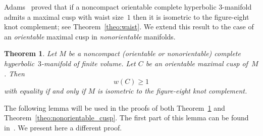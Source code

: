 \documentclass[11pt,reqno]{amsart}
\newtheorem{theorem}{Theorem}[section]
\newtheorem{proposition}[theorem]{Proposition}
\theoremstyle{definition}
\numberwithin{equation}{section}
\numberwithin{equation}{section}
\begin{document}
Adams~\cite{adams_waist} proved that if a noncompact orientable complete hyperbolic $3$-manifold admits a maximal cusp with waist size~$1$ then it is isometric to the figure-eight knot complement; see Theorem~\ref{theo:waist}.
We extend this result to the case of an \emph{orientable} maximal cusp in \emph{nonorientable} manifolds.


\begin{theorem} \label{theo:adams_nonorientable}
Let $M$ be a noncompact (orientable or nonorientable) complete hyperbolic~$3$-manifold of finite volume.
Let $C$ be an orientable maximal cusp of~$M$.
Then 
\[
w(C) \geq 1
\]
with equality if and only if $M$ is isometric to the figure-eight knot complement.
\end{theorem}


%




The following lemma will be used in the proofs of both Theorem~\ref{theo:adams_nonorientable} and Theorem~\ref{theo:nonorientable_cusp}.
The first part of this lemma can be found in~\cite[Lemma~2.7]{adams_waist}. 
We present here a different proof.
\end{document}
